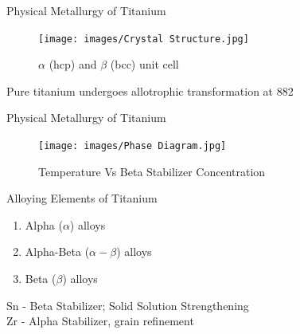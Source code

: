 \documentclass[10pt]{beamer}
\begin{document}
{%
\begin{frame}[fragile]{Physical Metallurgy of Titanium}

\begin{figure}[H]
    \centering
        \texttt{[image: images/Crystal Structure.jpg]}
        \caption{$\alpha$ (hcp) and $\beta$ (bcc) unit cell}
\end{figure}

Pure titanium undergoes allotrophic transformation at 882 \degC

\end{frame}
}

{%

\begin{frame}[fragile]{Physical Metallurgy of Titanium}

\begin{figure}[H]
    \centering
        \texttt{[image: images/Phase Diagram.jpg]}
        \caption{Temperature Vs Beta Stabilizer Concentration}       
\end{figure}

\end{frame}
}

{%

\begin{frame}[fragile]{Alloying Elements of Titanium}

\begin{enumerate}
\item Alpha ($\alpha$) alloys
\item Alpha-Beta ($\alpha-\beta$) alloys
\item Beta ($\beta$) alloys
\end{enumerate}

Sn - Beta Stabilizer; Solid Solution Strengthening \\
Zr - Alpha Stabilizer, grain refinement
\end{frame}
}
\end{document}
